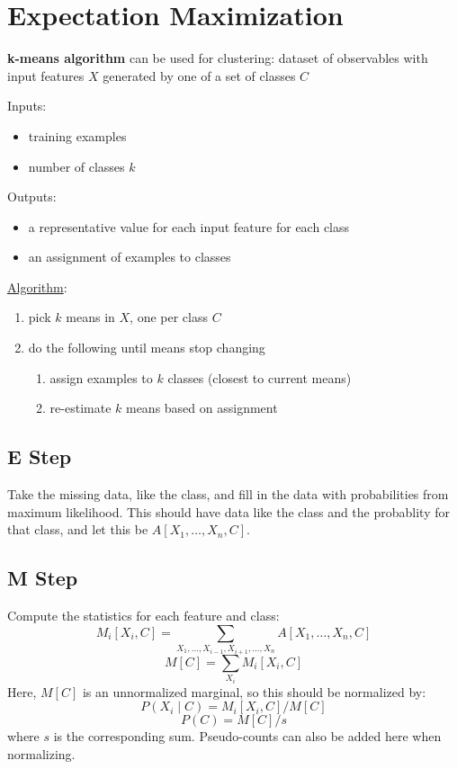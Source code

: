 \documentclass[11pt]{article}
\begin{document}
\section{Expectation Maximization}
\label{sec:orgd2c8f59}
\textbf{k-means algorithm} can be used for clustering: dataset of observables with input
features \(X\) generated by one of a set of classes \(C\)

Inputs:
\begin{itemize}
\item training examples
\item number of classes \(k\)
\end{itemize}

Outputs:
\begin{itemize}
\item a representative value for each input feature for each class
\item an assignment of examples to classes
\end{itemize}

\uline{Algorithm}:
\begin{enumerate}
\item pick \(k\) means in \(X\), one per class \(C\)
\item do the following until means stop changing
\begin{enumerate}
\item assign examples to \(k\) classes (closest to current means)
\item re-estimate \(k\) means based on assignment
\end{enumerate}
\end{enumerate}
\subsection{E Step}
\label{sec:org5b613fb}
Take the missing data, like the class, and fill in the data with probabilities from
maximum likelihood.
This should have data like the class and the probablity for that class, and let
this be \(A[X_{1}, \dots, X_{n}, C]\).
\subsection{M Step}
\label{sec:org3a8b7fe}
Compute the statistics for each feature and class:
$$ M_{i}[X_{i}, C] = \sum_{X_{1}, \dots, X_{i-1},X_{i+1}, \dots, X_{n}} A[X_{1}, \dots, X_{n}, C] $$
$$ M[C] = \sum_{X_{i}} M_{i} [X_{i}, C] $$
Here, \(M[C]\) is an unnormalized marginal, so this should be normalized by:
$$ P(X_{i} \mid C) = M_{i}[X_{i}, C] / M[C] $$
$$ P(C) = M[C] / s $$
where \(s\) is the corresponding sum.
Pseudo-counts can also be added here when normalizing.
\end{document}
